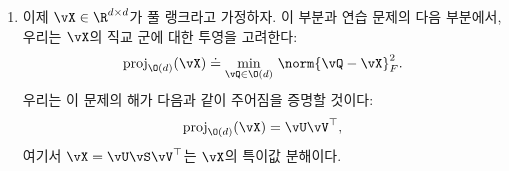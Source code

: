 \documentclass[../../book-main_ko.tex]{subfiles}
\begin{document}
\begin{exercise}
\begin{enumerate}
        \begin{equation}\label{eq:exercise-riemann-hess-orthogonal-group}
            \mathrm{Hess}\, f(\vQ) = \cP_{T_{\vQ}\O(d)} \left(
            \nabla^2 f(\vQ) - \Symm(\vQ^\top \nabla f(\vQ)) \kron \vI
            \right) \cP_{T_{\vQ}\O(d)},
        \end{equation}
        여기서 $\Symm(\vDelta) = \tfrac{1}{2}(\vDelta + \vDelta^\top)$는 대칭 행렬의 집합에 대한 직교 투영을 나타내고, $\kron$는 행렬의 크로네커 곱을 나타낸다. 이전 표현식에 나타나는 연산자들을 ${d \times d}$ 행렬 자체가 \textbf{아니라} \textit{${d \times d}$ 행렬에 대한 선형 변환}으로 해석하도록 주의하라. 최적화 문제 \eqref{eq:exercise-orthogonal-group-constrained-max}에 대한 \textit{2차 최적성 조건}은 리만 헤시안으로 표현될 수 있다:
        \begin{equation*}
            \mathrm{Hess}\, f(\vQ) \preceq \mathbf{0}.
        \end{equation*}
        최소화 문제의 경우, 부호가 반대이다.

        (\textit{힌트: 핵심은 가능한 한 간결한 형태인 \eqref{eq:exercise-riemann-hess-orthogonal-group}를 얻기 위해 계산을 조작하는 것이다. 이를 위해, 크로네커 곱의 다음 동형을 사용하라: 만약 $\vA$, $\vX$, 그리고 $\vB$가 호환되는 크기의 행렬이라면, 다음이 성립한다:
        \begin{equation*}
            (\vB^\top \kron \vA) \Vec(\vX) = \Vec(\vA \vX \vB),
        \end{equation*}
        여기서 $\Vec(\vX)$는 행렬 인수의 열을 ``왼쪽에서 오른쪽으로'' 벡터로 쌓는 것을 나타낸다. 우리는 \eqref{eq:exercise-riemann-hess-orthogonal-group}에서 이 동형을 사용하여 두 행렬의 크로네커 곱을 정규적인 방법으로 행렬에 대한 연산자로 정의한다.})

        \item 이제 $\vX \in \R^{d\times d}$가 풀 랭크라고 가정하자. 이 부분과 연습 문제의 다음 부분에서, 우리는 $\vX$의 직교 군에 대한 투영을 고려한다:
        \begin{equation}\label{eq:projection-onto-ogrp-defn}
            \mathrm{proj}_{\O(d)}(\vX) \doteq
            \min_{\vQ \in \O(d)
            }\, \norm{\vQ - \vX}_F^2.
        \end{equation}
        우리는 이 문제의 해가 다음과 같이 주어짐을 증명할 것이다:
        \begin{equation*}
            \mathrm{proj}_{\O(d)}(\vX)
            =
            \vU \vV^\top,
        \end{equation*}
        여기서 $\vX = \vU \vS \vV^\top$는 $\vX$의 특이값 분해이다.


\end{enumerate}
\end{exercise}
\end{document}
